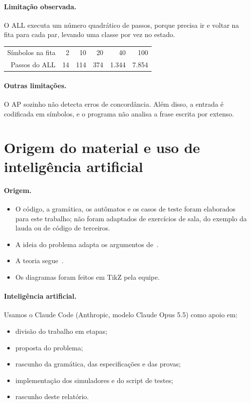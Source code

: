 \documentclass[11pt,a4paper]{article}
\begin{document}
\paragraph{Limitação observada.} O ALL executa um número quadrático de passos, porque precisa ir e voltar na fita para cada par, levando uma classe por vez no estado.

\begin{center}
\begin{tabular}{rrrrrr}
\toprule
Símbolos na fita & 2 & 10 & 20 & 40 & 100 \\
Passos do ALL & 14 & 114 & 374 & 1.344 & 7.854 \\
\bottomrule
\end{tabular}
\end{center}

\paragraph{Outras limitações.} O AP sozinho não detecta erros de concordância. Além disso, a entrada é codificada em símbolos, e o programa não analisa a frase escrita por extenso.

\section{Origem do material e uso de inteligência artificial}

\paragraph{Origem.}
\begin{itemize}
  \item O código, a gramática, os autômatos e os casos de teste foram elaborados para este trabalho; não foram adaptados de exercícios de sala, do exemplo da lauda ou de código de terceiros.
  \item A ideia do problema adapta os argumentos de~\cite{shieber,barhillel,pullum}.
  \item A teoria segue~\cite{sipser,hopcroft,kuroda}.
  \item Os diagramas foram feitos em TikZ pela equipe.
\end{itemize}

\paragraph{Inteligência artificial.} Usamos o Claude Code (Anthropic, modelo Claude Opus 5.5) como apoio em:
\begin{itemize}
  \item divisão do trabalho em etapas;
  \item proposta do problema;
  \item rascunho da gramática, das especificações e das provas;
  \item implementação dos simuladores e do script de testes;
  \item rascunho deste relatório.
\end{itemize}
\end{document}
